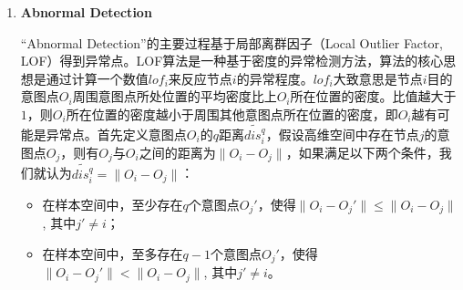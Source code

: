 \documentclass[lettersize,journal]{IEEEtran}
\begin{document}
\begin{enumerate}













\item \textbf{Abnormal Detection}

“Abnormal Detection”的主要过程基于局部离群因子（Local Outlier Factor, LOF）得到异常点。LOF算法是一种基于密度的异常检测方法，算法的核心思想是通过计算一个数值$lof_i$来反应节点$i$的异常程度。$lof_i$大致意思是节点$i$目的意图点$O_i$周围意图点所处位置的平均密度比上$O_i$所在位置的密度。比值越大于$1$，则$O_i$所在位置的密度越小于周围其他意图点所在位置的密度，即$O_i$越有可能是异常点。首先定义意图点$O_i$的$q$距离$\widetilde{dis_i^q}$，假设高维空间中存在节点$j$的意图点$O_j$，则有$O_j$与$O_i$之间的距离为$\|O_i-O_j\|$，如果满足以下两个条件，我们就认为$\widetilde{dis_i^q}=\|O_i-O_j\|$：

\begin{itemize}
    \item 在样本空间中，至少存在$q$个意图点$O_j'$，使得$\|O_i-O_j'\|\leq \|O_i-O_j\|$, 其中$j'\neq i$；
    \item 在样本空间中，至多存在$q-1$个意图点$O_j'$，使得$\|O_i-O_j'\|< \|O_i-O_j\|$, 其中$j'\neq i$。
\end{itemize}


\end{enumerate}
\end{document}
